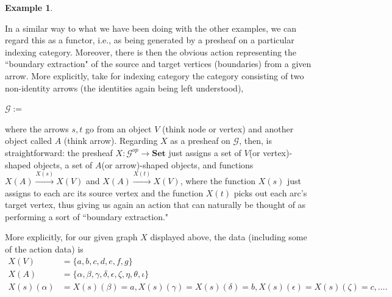 \documentclass[a4paper]{book}
\theoremstyle{definition}
\newtheorem{example}{Example}[section]
\theoremstyle{definition}
\theoremstyle{definition}
\theoremstyle{theorem}
\theoremstyle{definition}
\begin{document}
\begin{example}
\begin{center}
			\end{center} 
			In a similar way to what we have been doing with the other examples, we can regard this as a functor, i.e., as being generated by a presheaf on a particular indexing category. Moreover, there is then the obvious action representing the ``boundary extraction" of the source and target vertices (boundaries) from a given arrow. More explicitly, take for indexing category the category consisting of two non-identity arrows (the identities again being left understood),
			\begin{center} 
				$\mathcal{G} :=$ 
			\end{center} 
			where the arrows $s,t$ go from an object $V$ (think node or vertex) and another object called $A$ (think arrow). Regarding $X$ as a presheaf on $\mathcal{G}$, then, is straightforward: the presheaf $X: \mathcal{G}^{op} \rightarrow \textbf{Set}$ just assigns a set of $V$(or vertex)-shaped objects, a set of $A$(or arrow)-shaped objects, and functions $X(A) \xrightarrow{X(s)} X(V)$ and $X(A) \xrightarrow{X(t)} X(V)$, where the function $X(s)$ just assigns to each arc its source vertex and the function $X(t)$ picks out each arc's target vertex, thus giving us again an action that can naturally be thought of as performing a sort of ``boundary extraction." \par 
			More explicitly, for our given graph $X$ displayed above, the data (including some of the action data) is 
			\begin{equation*}
			\begin{split}
			X(V) & = \{a,b,c,d,e,f,g\} \\ 
			X(A) & = \{\alpha, \beta, \gamma, \delta, \epsilon, \zeta, \eta, \theta, \iota\} \\ 
			X(s)(\alpha) & = X(s)(\beta) = a , X(s)(\gamma) = X(s)(\delta) = b , X(s)(\epsilon) = X(s)(\zeta) = c, \dots . 
			\end{split}
			\end{equation*}

\end{example}
\end{document}
